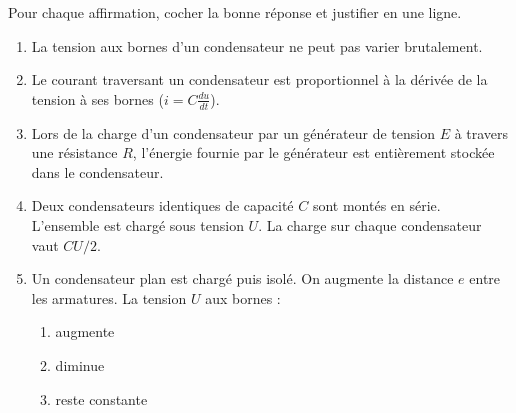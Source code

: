 \documentclass[11pt]{article}
\begin{document}
\begin{exercice}
Pour chaque affirmation, cocher la bonne réponse et justifier en une ligne.
\begin{enumerate}
    \item La tension aux bornes d'un condensateur ne peut pas varier brutalement.
    \item Le courant traversant un condensateur est proportionnel à la dérivée de la tension à ses bornes ($i = C \frac{du}{dt}$).
    \item Lors de la charge d'un condensateur par un générateur de tension $E$ à travers une résistance $R$, l'énergie fournie par le générateur est entièrement stockée dans le condensateur.
    \item Deux condensateurs identiques de capacité $C$ sont montés en série. L'ensemble est chargé sous tension $U$. La charge sur chaque condensateur vaut $C U / 2$.
    \item Un condensateur plan est chargé puis isolé. On augmente la distance $e$ entre les armatures. La tension $U$ aux bornes :
    \begin{enumerate}
        \item augmente
        \item diminue
        \item reste constante
    \end{enumerate}
\end{enumerate}
\end{exercice}
\end{document}
